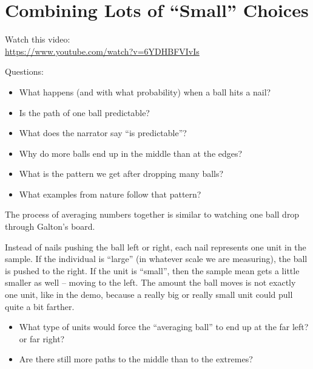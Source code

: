 \def\theTopic{Reading 20 }

\section{ Combining Lots of ``Small'' Choices}

Watch this video:\\
\url{https://www.youtube.com/watch?v=6YDHBFVIvIs}


Questions:
\begin{itemize}
\item What happens (and with what probability) when a ball hits a
  nail?  \vspace{2cm}
\item Is the path of one ball predictable?  \vspace{2cm}
\item What does the narrator say ``is predictable''?  \vspace{2cm}
\item Why do more balls end up in the middle than at the edges?   \vspace{2cm}
\item What is the pattern we get after dropping many balls?  \vspace{2cm}
\item What examples from nature follow that pattern?  \vspace{2cm}
\end{itemize}

The process of averaging numbers together is similar to watching one
ball drop through Galton's board.

Instead of nails pushing the ball left or right, each nail represents
one unit in the sample.   If the individual is ``large'' (in whatever
scale we are measuring), the ball is pushed to the right.  If the unit
is ``small'', then the sample mean gets a little smaller as well --
moving to the left. The amount the ball moves is not exactly one unit,
like in the demo, because a really big or really small unit could pull
quite a bit farther. 

\begin{itemize}
\item What type of units would force the ``averaging ball'' to end up
  at the far left?  or far right?  \vspace{2cm}
\item Are there still more paths to the middle than to the extremes?
  \vspace{2cm} 
\end{itemize}

